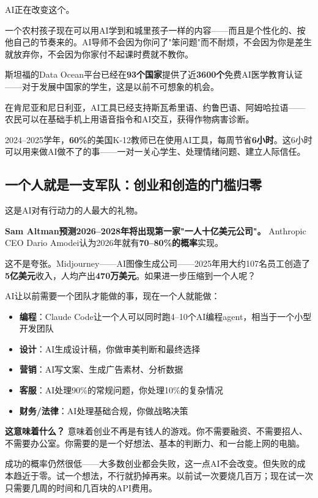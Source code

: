 \documentclass[a4paper,12pt,UTF8]{ctexart}
\begin{document}
AI正在改变这个。

一个农村孩子现在可以用AI学到和城里孩子一样的内容——而且是个性化的、按他自己的节奏来的。AI导师不会因为你问了"笨问题"而不耐烦，不会因为你是差生就放弃你，不会因为你家付不起课时费就不教你。

斯坦福的Data Ocean平台已经在\textbf{93个国家}提供了近\textbf{3600个}免费AI医学教育认证——对于发展中国家的学生，这是以前不可想象的机会。

在肯尼亚和尼日利亚，AI工具已经支持斯瓦希里语、约鲁巴语、阿姆哈拉语——农民可以在基础手机上用语音指令和AI交互，获得作物病害诊断。

2024--2025学年，\textbf{60\%}的美国K-12教师已在使用AI工具，每周节省\textbf{6小时}。这6小时可以用来做AI做不了的事——一对一关心学生、处理情绪问题、建立人际信任。

\subsection{一个人就是一支军队：创业和创造的门槛归零}

这是AI对有行动力的人最大的礼物。

\textbf{Sam Altman预测2026--2028年将出现第一家"一人十亿美元公司"。} Anthropic CEO Dario Amodei认为2026年就有\textbf{70--80\%的概率}实现。

这不是夸张。Midjourney——AI图像生成公司——2025年用大约107名员工创造了\textbf{5亿美元}收入，人均产出\textbf{470万美元}。如果进一步压缩到一个人呢？

AI让以前需要一个团队才能做的事，现在一个人就能做：
\begin{itemize}
\item \textbf{编程}：Claude Code让一个人可以同时跑4--10个AI编程agent，相当于一个小型开发团队
\item \textbf{设计}：AI生成设计稿，你做审美判断和最终选择
\item \textbf{营销}：AI写文案、生成广告素材、分析数据
\item \textbf{客服}：AI处理90\%的常规问题，你处理10\%的复杂情况
\item \textbf{财务/法律}：AI处理基础合规，你做战略决策
\end{itemize}

\textbf{这意味着什么？} 意味着创业不再是有钱人的游戏。你不需要融资、不需要招人、不需要办公室。你需要的是一个好想法、基本的判断力、和一台能上网的电脑。

成功的概率仍然很低——大多数创业都会失败，这一点AI不会改变。但失败的成本趋近于零。试一个想法，不行就扔掉再来。以前试一次要烧几百万；现在试一次只需要几周的时间和几百块的API费用。
\end{document}
